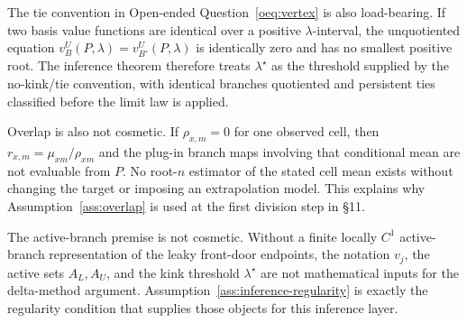 \documentclass[11pt]{article}
\theoremstyle{definition}
\theoremstyle{plain}
\theoremstyle{remark}
\begin{document}
The tie convention in Open-ended Question~\ref{oeq:vertex} is also load-bearing.  If
two basis value functions are identical over a positive \(\lambda\)-interval, the
unquotiented equation \(v_B^U(P,\lambda)=v_{B'}^U(P,\lambda)\) is identically zero and
has no smallest positive root.  The inference theorem therefore treats
\(\lambda^\star\) as the threshold supplied by the no-kink/tie convention, with
identical branches quotiented and persistent ties classified before the limit law is
applied.

Overlap is also not cosmetic.  If \(\rho_{x,m}=0\) for one observed cell, then
\(r_{x,m}=\mu_{xm}/\rho_{xm}\) and the plug-in branch maps involving that conditional
mean are not evaluable from \(P\).  No root-\(n\) estimator of the stated cell mean
exists without changing the target or imposing an extrapolation model.  This explains
why Assumption~\ref{ass:overlap} is used at the first division step in \S11.

The active-branch premise is not cosmetic.  Without a finite locally \(C^1\)
active-branch representation of the leaky front-door endpoints, the notation \(v_j\),
the active sets \(A_L,A_U\), and the kink threshold \(\lambda^\star\) are not
mathematical inputs for the delta-method argument.  Assumption~\ref{ass:inference-regularity}
is exactly the regularity condition that supplies those objects for this inference
layer.
\end{document}

